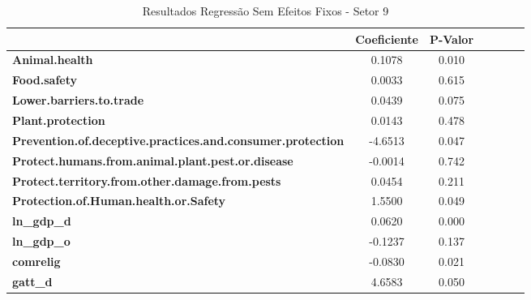\begin{table}[ht]
    \begin{center}
        \begin{tabular}{lcccccc}
            & \textbf{Coeficiente} & \textbf{P-Valor}\\
            \midrule
\textbf{Animal.health}                                             &       0.1078  &         0.010   \\
\textbf{Food.safety}                                               &       0.0033  &         0.615   \\
\textbf{Lower.barriers.to.trade}                                   &       0.0439  &         0.075   \\
\textbf{Plant.protection}                                          &       0.0143  &         0.478   \\
\textbf{Prevention.of.deceptive.practices.and.consumer.protection} &      -4.6513  &         0.047   \\
\textbf{Protect.humans.from.animal.plant.pest.or.disease}          &      -0.0014  &         0.742   \\
\textbf{Protect.territory.from.other.damage.from.pests}            &       0.0454  &         0.211   \\
\textbf{Protection.of.Human.health.or.Safety}                      &       1.5500  &         0.049   \\
\textbf{ln\_gdp\_d}                                                &       0.0620  &         0.000   \\
\textbf{ln\_gdp\_o}                                                &      -0.1237  &         0.137   \\
\textbf{comrelig}                                                  &      -0.0830  &         0.021   \\
\textbf{gatt\_d}                                                   &       4.6583  &         0.050   \\
\bottomrule
\end{tabular}
\caption{Resultados Regressão Sem Efeitos Fixos - Setor 9}
\end{center}
\end{table}